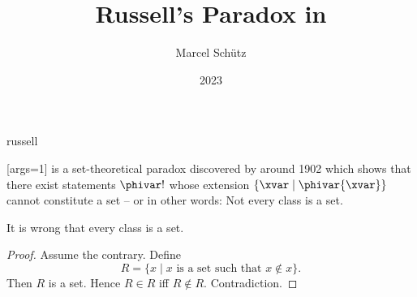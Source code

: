 \documentclass{stex}
\begin{document}
\title{Russell's Paradox in \Naproche}
\author{Marcel Schütz}
\date{2023}
\maketitle
\begin{smodule}{russell}
\begin{sparagraph}
  [args=1]{\maincomp{\varphi}}
  \noindent \emph{} is a set-theoretical paradox discovered by  around 1902 \cite[chapter XV]{Frege1980} which shows that there exist statements $\phivar!$ whose extension $\{\xvar\mid\phivar{\xvar}\}$ cannot constitute a set – or in other words: Not every class is a set.
\end{sparagraph}

\begin{forthel}

  \begin{theorem*}\label{russell_paradox}
    It is wrong that every class is a set.
  \end{theorem*}
  \begin{proof}
    Assume the contrary.
    Define \[R = \{ x \mid \text{$x$ is a set such that $x \notin x$} \}.\]
    Then $R$ is a set.
    Hence $R \in R$ iff $R \notin R$.
    Contradiction.
  \end{proof}
\end{forthel}
\end{smodule}
\printbibliography
\end{document}
